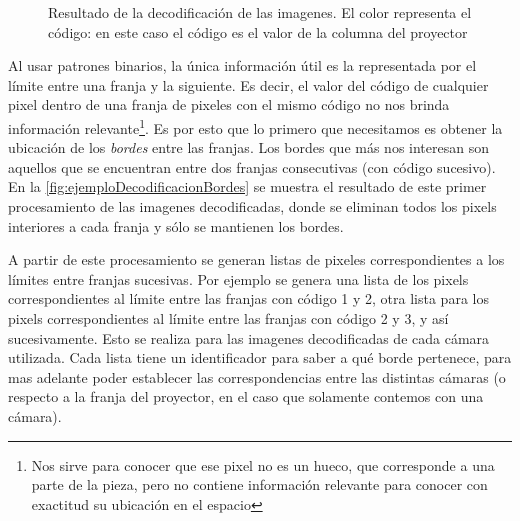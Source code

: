\begin{figure}[!bth]
    \myfloatalign
        \caption{Resultado de la decodificación de las imagenes. El color representa el código: en este caso el código es el valor de la columna del proyector}
        \label{fig:ejemploDecodificacion}
\end{figure}

Al usar patrones binarios, la única información útil es la representada por el límite entre una franja y la siguiente. Es decir, el valor del código de cualquier pixel dentro de una franja de pixeles con el mismo código no nos brinda información relevante\footnote{Nos sirve para conocer que ese pixel no es un hueco, que corresponde a una parte de la pieza, pero no contiene información relevante para conocer con exactitud su ubicación en el espacio}. Es por esto que lo primero que necesitamos es obtener la ubicación de los \emph{bordes} entre las franjas. Los bordes que más nos interesan son aquellos que se encuentran entre dos franjas consecutivas (con código sucesivo). En la \autoref{fig:ejemploDecodificacionBordes} se muestra el resultado de este primer procesamiento de las imagenes decodificadas, donde se eliminan todos los pixels interiores a cada franja y sólo se mantienen los bordes.

A partir de este procesamiento se generan listas de pixeles correspondientes a los límites entre franjas sucesivas. Por ejemplo se genera una lista de los pixels correspondientes al límite entre las franjas con código 1 y 2, otra lista para los pixels correspondientes al límite entre las franjas con código 2 y 3, y así sucesivamente. Esto se realiza para las imagenes decodificadas de cada cámara utilizada. Cada lista tiene un identificador para saber a qué borde pertenece, para mas adelante poder establecer las correspondencias entre las distintas cámaras (o respecto a la franja del proyector, en el caso que solamente contemos con una cámara).


